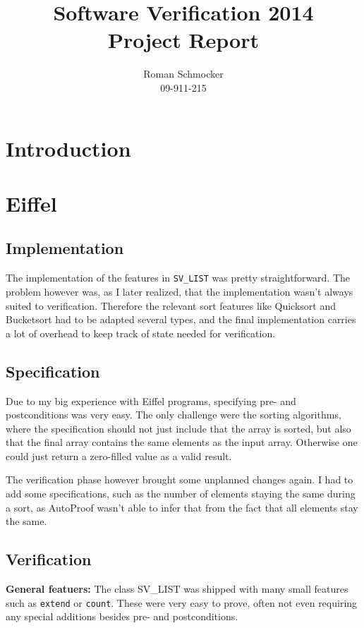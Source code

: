\documentclass[a4paper,10pt]{article}
\title{Software Verification 2014 \\ Project Report}
\author{Roman Schmocker \\ 09-911-215}
\begin{document}
\maketitle


\section{Introduction}

\section{Eiffel}

\subsection{Implementation}

The implementation of the features in \lstinline!SV_LIST! was pretty straightforward.
The problem however was, as I later realized, that the implementation wasn't always suited to verification.
Therefore the relevant sort features like Quicksort and Bucketsort had to be adapted several types, 
and the final implementation carries a lot of overhead to keep track of state needed for verification.

\subsection{Specification}

Due to my big experience with Eiffel programs, specifying pre- and postconditions was very easy.
The only challenge were the sorting algorithms, where the specification should not just include that the array is sorted,
but also that the final array contains the same elements as the input array.
Otherwise one could just return a zero-filled value as a valid result.

The verification phase however brought some unplanned changes again.
I had to add some specifications, such as the number of elements staying the same during a sort, 
as AutoProof wasn't able to infer that from the fact that all elements stay the same.

\subsection{Verification}

\textbf{General featuers:}
The class SV_LIST was shipped with many small features such as \lstinline!extend! or \lstinline!count!.
These were very easy to prove, often not even requiring any special additions besides pre- and postconditions.
\end{document}

